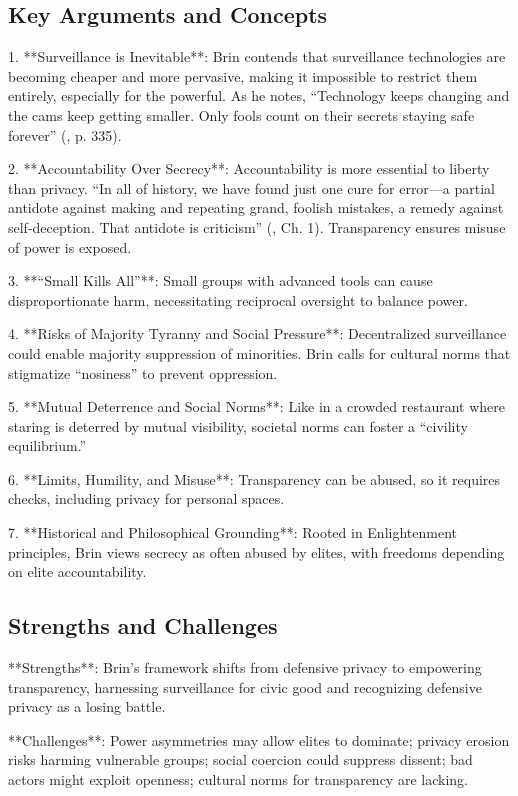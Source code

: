 \documentclass[12pt]{article}
\begin{document}
\subsection{Key Arguments and Concepts}

1. **Surveillance is Inevitable**: Brin contends that surveillance technologies are becoming cheaper and more pervasive, making it impossible to restrict them entirely, especially for the powerful. As he notes, ``Technology keeps changing and the cams keep getting smaller. Only fools count on their secrets staying safe forever'' (\citealp{Brin1998}, p. 335).

2. **Accountability Over Secrecy**: Accountability is more essential to liberty than privacy. ``In all of history, we have found just one cure for error—a partial antidote against making and repeating grand, foolish mistakes, a remedy against self-deception. That antidote is criticism'' (\citealp{Brin1998}, Ch. 1). Transparency ensures misuse of power is exposed.

3. **``Small Kills All''**: Small groups with advanced tools can cause disproportionate harm, necessitating reciprocal oversight to balance power.

4. **Risks of Majority Tyranny and Social Pressure**: Decentralized surveillance could enable majority suppression of minorities. Brin calls for cultural norms that stigmatize ``nosiness'' to prevent oppression.

5. **Mutual Deterrence and Social Norms**: Like in a crowded restaurant where staring is deterred by mutual visibility, societal norms can foster a ``civility equilibrium.''

6. **Limits, Humility, and Misuse**: Transparency can be abused, so it requires checks, including privacy for personal spaces.

7. **Historical and Philosophical Grounding**: Rooted in Enlightenment principles, Brin views secrecy as often abused by elites, with freedoms depending on elite accountability.

\subsection{Strengths and Challenges}

**Strengths**: Brin's framework shifts from defensive privacy to empowering transparency, harnessing surveillance for civic good and recognizing defensive privacy as a losing battle.

**Challenges**: Power asymmetries may allow elites to dominate; privacy erosion risks harming vulnerable groups; social coercion could suppress dissent; bad actors might exploit openness; cultural norms for transparency are lacking.
\end{document}

